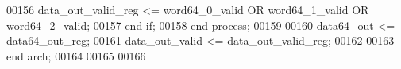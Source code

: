 \begin{DoxyCode}
00156       \textcolor{vhdlchar}{data_out_valid_reg} \textcolor{vhdlchar}{<=} \textcolor{vhdlchar}{word64_0_valid} \textcolor{keywordflow}{OR} \textcolor{vhdlchar}{word64_1_valid} \textcolor{keywordflow}{OR} \textcolor{vhdlchar}{word64_2_valid};
00157    \textcolor{keywordflow}{end} \textcolor{keywordflow}{if};
00158 \textcolor{keywordflow}{end} \textcolor{keywordflow}{process};
00159     
00160 \textcolor{vhdlchar}{data64_out}     \textcolor{vhdlchar}{<=} \textcolor{vhdlchar}{data64_out_reg};
00161 \textcolor{vhdlchar}{data_out_valid} \textcolor{vhdlchar}{<=} \textcolor{vhdlchar}{data_out_valid_reg};
00162 
00163 \textcolor{keywordflow}{end} \textcolor{vhdlchar}{arch};   
00164 
00165 
00166 
\end{DoxyCode}
